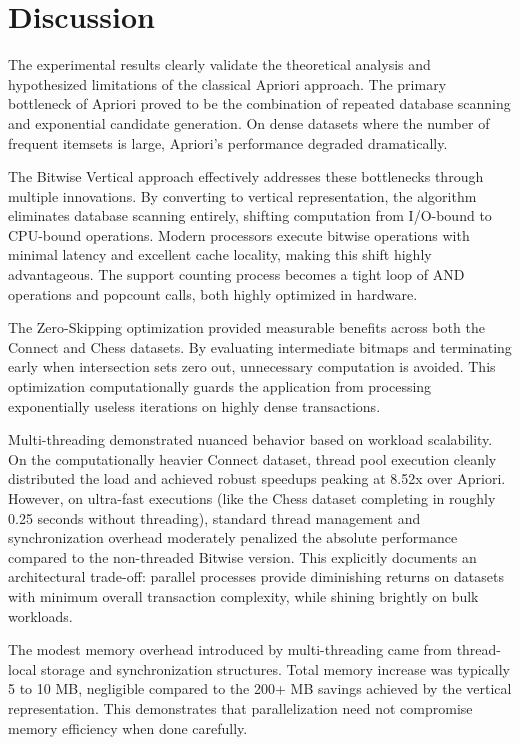 \documentclass[conference]{IEEEtran}
\begin{document}
\section{Discussion}

The experimental results clearly validate the theoretical analysis and hypothesized limitations of the classical Apriori approach. The primary bottleneck of Apriori proved to be the combination of repeated database scanning and exponential candidate generation. On dense datasets where the number of frequent itemsets is large, Apriori's performance degraded dramatically.

The Bitwise Vertical approach effectively addresses these bottlenecks through multiple innovations. By converting to vertical representation, the algorithm eliminates database scanning entirely, shifting computation from I/O-bound to CPU-bound operations. Modern processors execute bitwise operations with minimal latency and excellent cache locality, making this shift highly advantageous. The support counting process becomes a tight loop of AND operations and popcount calls, both highly optimized in hardware.

The Zero-Skipping optimization provided measurable benefits across both the Connect and Chess datasets. By evaluating intermediate bitmaps and terminating early when intersection sets zero out, unnecessary computation is avoided. This optimization computationally guards the application from processing exponentially useless iterations on highly dense transactions.

Multi-threading demonstrated nuanced behavior based on workload scalability. On the computationally heavier Connect dataset, thread pool execution cleanly distributed the load and achieved robust speedups peaking at 8.52x over Apriori. However, on ultra-fast executions (like the Chess dataset completing in roughly 0.25 seconds without threading), standard thread management and synchronization overhead moderately penalized the absolute performance compared to the non-threaded Bitwise version. This explicitly documents an architectural trade-off: parallel processes provide diminishing returns on datasets with minimum overall transaction complexity, while shining brightly on bulk workloads.

The modest memory overhead introduced by multi-threading came from thread-local storage and synchronization structures. Total memory increase was typically 5 to 10 MB, negligible compared to the 200+ MB savings achieved by the vertical representation. This demonstrates that parallelization need not compromise memory efficiency when done carefully.
\end{document}

